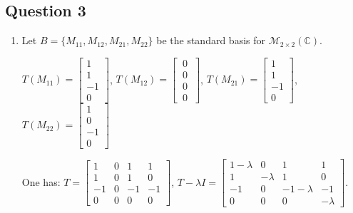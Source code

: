 \documentclass{article}
\begin{document}
\subsection*{Question 3}
\begin{enumerate}[label=(\alph*)]
    \item Let $B=\{M_{11}, M_{12}, M_{21}, M_{22}\}$ be the standard basis for $\mathcal{M}_{2 \times 2} \mathbb{(C)}$.

$T(M_{11})=\begin{bmatrix} 
    1\\
    1 \\
    -1 \\
    0
    \end{bmatrix}$, $T(M_{12})=\begin{bmatrix} 
    \ 0\ \\
    \ 0\  \\
    \ 0\  \\
    \ 0\ 
    \end{bmatrix}$, $T(M_{21})=\begin{bmatrix} 
    1\\
    1 \\
    -1 \\
    0
    \end{bmatrix}$, $T(M_{22})=\begin{bmatrix} 
    1\\
    0 \\
    -1 \\
    0
    \end{bmatrix}$
    
    One has: $T=\begin{bmatrix} 
    1 & 0 & 1 & 1\\
    1 & 0 & 1 & 0\\
    -1 & 0 & -1 & -1 \\
    0 & 0 & 0 & 0
    \end{bmatrix}$, $T-\lambda I=\begin{bmatrix} 
    1-\lambda & 0 & 1 & 1\\
    1 & -\lambda & 1 & 0\\
    -1 & 0 & -1-\lambda & -1 \\
    0 & 0 & 0 & -\lambda
    \end{bmatrix}$. 
    

\end{enumerate}
\end{document}
